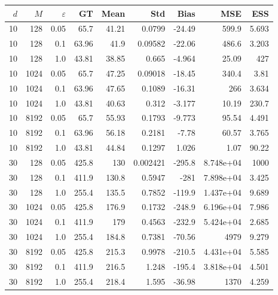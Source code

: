 \documentclass{article}
\begin{document}
\begin{table}[htbp]
\centering
\scriptsize
\setlength{\tabcolsep}{4pt}
\begin{tabular}{rrr|rrrrrr}
\toprule
$d$ & $M$ & $\varepsilon$ & GT & Mean & Std & Bias & MSE & ESS \\
\midrule
\rowcolor{orange!50}10 & 128 & 0.05 & 65.7 & 41.21 & 0.0799 & -24.49 & 599.9 & 5.693 \\
\rowcolor{orange!50}10 & 128 & 0.1 & 63.96 & 41.9 & 0.09582 & -22.06 & 486.6 & 3.203 \\
\rowcolor{yellow!40}10 & 128 & 1.0 & 43.81 & 38.85 & 0.665 & -4.964 & 25.09 & 427 \\
\midrule
\rowcolor{yellow!40}10 & 1024 & 0.05 & 65.7 & 47.25 & 0.09018 & -18.45 & 340.4 & 3.81 \\
\rowcolor{yellow!40}10 & 1024 & 0.1 & 63.96 & 47.65 & 0.1089 & -16.31 & 266 & 3.634 \\
10 & 1024 & 1.0 & 43.81 & 40.63 & 0.312 & -3.177 & 10.19 & 230.7 \\
\midrule
\rowcolor{yellow!40}10 & 8192 & 0.05 & 65.7 & 55.93 & 0.1793 & -9.773 & 95.54 & 4.491 \\
\rowcolor{yellow!40}10 & 8192 & 0.1 & 63.96 & 56.18 & 0.2181 & -7.78 & 60.57 & 3.765 \\
10 & 8192 & 1.0 & 43.81 & 44.84 & 0.1297 & 1.026 & 1.07 & 90.22 \\
\midrule
\rowcolor{red!40}30 & 128 & 0.05 & 425.8 & 130 & 0.002421 & -295.8 & 8.748e+04 & 1000 \\
\rowcolor{red!40}30 & 128 & 0.1 & 411.9 & 130.8 & 0.5947 & -281 & 7.898e+04 & 3.425 \\
\rowcolor{orange!50}30 & 128 & 1.0 & 255.4 & 135.5 & 0.7852 & -119.9 & 1.437e+04 & 9.689 \\
\midrule
\rowcolor{red!40}30 & 1024 & 0.05 & 425.8 & 176.9 & 0.1732 & -248.9 & 6.196e+04 & 7.986 \\
\rowcolor{red!40}30 & 1024 & 0.1 & 411.9 & 179 & 0.4563 & -232.9 & 5.424e+04 & 2.685 \\
\rowcolor{yellow!40}30 & 1024 & 1.0 & 255.4 & 184.8 & 0.7381 & -70.56 & 4979 & 9.279 \\
\midrule
\rowcolor{orange!50}30 & 8192 & 0.05 & 425.8 & 215.3 & 0.9978 & -210.5 & 4.431e+04 & 5.585 \\
\rowcolor{orange!50}30 & 8192 & 0.1 & 411.9 & 216.5 & 1.248 & -195.4 & 3.818e+04 & 4.501 \\
\rowcolor{yellow!40}30 & 8192 & 1.0 & 255.4 & 218.4 & 1.595 & -36.98 & 1370 & 4.259 \\

\end{tabular}
\end{table}
\end{document}
